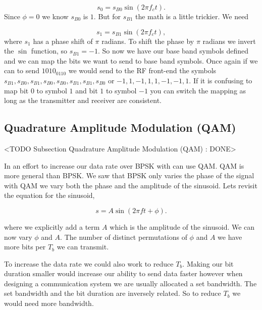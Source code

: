 \begin{equation}
s_0 = s_{B0}\sin\left(2\pi f_ct\right).
\end{equation}
\noindent
Since $\phi=0$ we know $s_{B0}$ is $1$. But for $s_{B1}$ the math is a little trickier. We need

\begin{equation}
s_1 = s_{B1}\sin\left(2\pi f_ct\right),
\end{equation}
\noindent
where $s_1$ has a phase shift of $\pi$ radians. To shift the phase by $\pi$ radians we invert the $\sin$ function, so $s_{B1}=-1$. So now we have our base band symbols defined and we can map the bits we want to send to base band symbols. Once again if we can to send $1010_0110$ we would send to the \ac{RF} front-end the symbols  $s_{B1}, s_{B0}, s_{B1}, s_{B0}, s_{B0}, s_{B1}, s_{B1}, s_{B0}$ or $-1,1,-1,1,1,-1,-1,1$. If it is confusing to map bit $0$ to symbol $1$ and bit $1$ to symbol $-1$ you can switch the mapping as long as the transmitter and receiver are consistent.
	
\subsection{Quadrature Amplitude Modulation (QAM)}
	<TODO Subsection Quadrature Amplitude Modulation (QAM) : DONE>

In an effort to increase our data rate over \ac{BPSK} with can use \ac{QAM}. \ac{QAM} is more general than \ac{BPSK}. We saw that \ac{BPSK} only varies the phase of the signal with \ac{QAM} we vary both the phase and the amplitude of the sinusoid. Lets revisit the equation for the sinusoid,

\begin{equation}
s = A\sin\left(2\pi ft + \phi\right).
\end{equation}
	
\noindent

where we explicitly add a term $A$ which is the amplitude of the sinusoid. We can now vary $\phi$ and $A$. The number of distinct permutations of $\phi$ and $A$ we have more bits per $T_b$ we can transmit.

To increase the data rate we could also work to reduce $T_b$. Making our bit duration smaller would increase our ability to send data faster however when designing a communication system we are usually allocated a set bandwidth. The set bandwidth and the bit duration are inversely related. So to reduce $T_b$ we would need more bandwidth.

